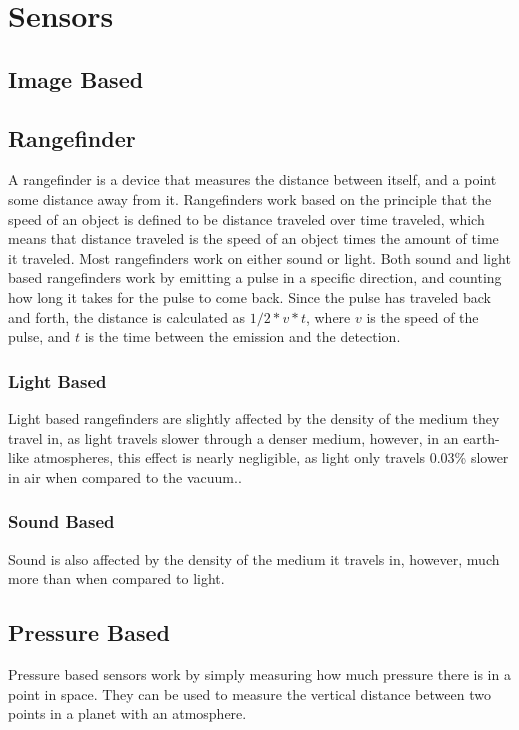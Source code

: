 \clearpage
\section{Sensors}

\subsection{Image Based}
\subsection{Rangefinder}
A rangefinder is a device that measures the distance between itself, and a point some distance away from it. Rangefinders work based on the principle that the speed of an object is defined to be distance traveled over time traveled, which means that distance traveled is the speed of an object times the amount of time it traveled. Most rangefinders work on either sound or light. Both sound and light based rangefinders work by emitting a pulse in a specific direction, and counting how long it takes for the pulse to come back. Since the pulse has traveled back and forth, the distance is calculated as \(1/2*v*t\), where \(v\) is the speed of the pulse, and \(t\) is the time between the emission and the detection.
\subsubsection{Light Based}
Light based rangefinders are slightly affected by the density of the medium they travel in, as light travels slower through a denser medium\cite{refraction}, however, in an earth-like atmospheres, this effect is nearly negligible, as light only travels 0.03\% slower in air when compared to the vacuum.\cite{refraction}. %
\subsubsection{Sound Based}
Sound is also affected by the density of the medium it travels in, however, much more than when compared to light\cite{speedOfSound}.
\subsection{Pressure Based}
Pressure based sensors work by simply measuring how much pressure there is in a point in space. They can be used to measure the vertical distance between two points in a planet with an atmosphere\cite{barometric1}\cite{barometric2}.
